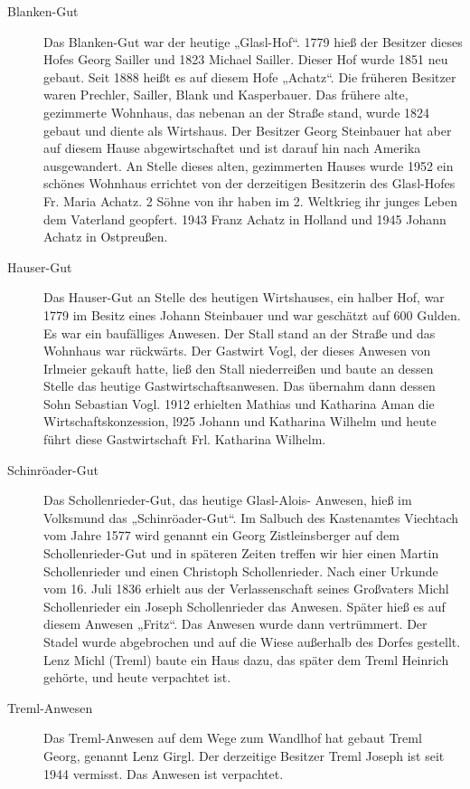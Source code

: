 \documentclass{book}
\begin{document}
\begin{description}
\item[Blanken-Gut] Das Blanken-Gut war der heutige „Glasl-Hof“. 1779
hieß der Besitzer dieses Hofes Georg Sailler und 1823 Michael Sailler.
Dieser Hof wurde 1851 neu gebaut. Seit 1888 heißt es auf diesem Hofe
„Achatz“. Die früheren Besitzer waren Prechler, Sailler, Blank und
Kasperbauer. Das frühere alte, gezimmerte Wohnhaus, das nebenan an der
Straße stand, wurde 1824 gebaut und diente als Wirtshaus. Der Besitzer
Georg Steinbauer hat aber auf diesem Hause abgewirtschaftet und ist
darauf hin nach Amerika ausgewandert. An Stelle dieses alten,
gezimmerten Hauses wurde 1952 ein schönes Wohnhaus errichtet von der
derzeitigen Besitzerin des Glasl-Hofes Fr. Maria Achatz. 2 Söhne von ihr
haben im 2. Weltkrieg ihr junges Leben dem Vaterland geopfert. 1943
Franz Achatz in Holland und 1945 Johann Achatz in Ostpreußen.

\item[Hauser-Gut] Das Hauser-Gut an Stelle des heutigen Wirtshauses, ein
halber Hof, war 1779 im Besitz eines Johann Steinbauer und war geschätzt
auf 600 Gulden. Es war ein baufälliges Anwesen. Der Stall stand an der
Straße und das Wohnhaus war rückwärts. Der Gastwirt Vogl, der dieses
Anwesen von Irlmeier gekauft hatte, ließ den Stall niederreißen und
baute an dessen Stelle das heutige Gastwirtschaftsanwesen. Das übernahm
dann dessen Sohn Sebastian Vogl. 1912 erhielten Mathias und Katharina
Aman die Wirtschaftskonzession, l925 Johann und Katharina Wilhelm und
heute führt diese Gastwirtschaft Frl. Katharina Wilhelm.

\item[Schinröader-Gut] Das Schollenrieder-Gut, das heutige Glasl-Alois-
Anwesen, hieß im Volksmund das „Schinröader-Gut“. Im Salbuch des
Kastenamtes Viechtach vom Jahre 1577 wird genannt ein Georg
Zistleinsberger auf dem Schollenrieder-Gut und in späteren Zeiten
treffen wir hier einen Martin Schollenrieder und einen Christoph
Schollenrieder. Nach einer Urkunde vom 16. Juli 1836 erhielt aus der
Verlassenschaft seines Großvaters Michl Schollenrieder ein Joseph
Schollenrieder das Anwesen. Später hieß es auf diesem Anwesen „Fritz“.
Das Anwesen wurde dann vertrümmert. Der Stadel wurde abgebrochen und auf
die Wiese außerhalb des Dorfes gestellt. Lenz Michl (Treml) baute ein
Haus dazu, das später dem Treml Heinrich gehörte, und heute verpachtet
ist.

\item[Treml-Anwesen] Das Treml-Anwesen auf dem Wege zum Wandlhof hat
gebaut Treml Georg, genannt Lenz Girgl. Der derzeitige Besitzer Treml
Joseph ist seit 1944 vermisst. Das Anwesen ist verpachtet.


\end{description}
\end{document}
